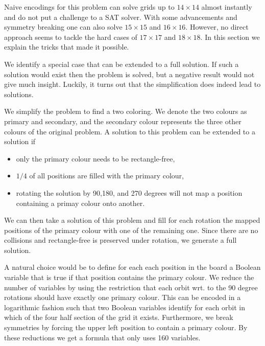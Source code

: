 \documentclass[conference]{IEEEtran}
\begin{document}
Naive encodings for this problem can solve grids up to $14\times 14$  almost instantly and do not put a challenge to a SAT solver.
With some advancements and symmetry breaking one can also solve $15\times 15$  and $16\times 16$. However, no direct approach seems to tackle
the hard cases of $17\times 17$ and $18\times 18$. In this section we explain the tricks that made it possible. 

We identify a special case that can be extended to a full solution. If such a solution would exist then the problem is
solved, but a negative result would not give much insight. Luckily, it turns out that the simplification does indeed
lead to solutions. 

We simplify the problem to find a two coloring. We denote the two colours as primary and secondary, and the secondary
colour represents the three other colours of the original problem. A solution to this problem can be extended to a
solution if

\begin{itemize}
    \item only the primary colour needs to be rectangle-free,
    \item $1/4$ of all positions are filled with the primary colour, 
    \item rotating the solution by 90,180, and 270 degrees will not map a position containing a primay colour onto
another. 
\end{itemize}

We can then take a solution of this problem and fill for each rotation the mapped positions of the primary colour with
one of the remaining one. Since there are no collisions and rectangle-free is preserved under rotation, we generate a
full solution. 



A natural choice would be to define for each  each position in the board a Boolean variable that is true if that
position contains the primary colour. We reduce the number of variables by using the restriction that each orbit wrt. to
the 90 degree rotations should have exactly one primary colour. This can be encoded in a logarithmic fashion such that
two Boolean variables identify for each orbit in which of the four half section of the grid it exists. Furthermore, we
break symmetries by forcing the upper left position to contain a primary colour. By these reductions we get a formula
that only uses 160 variables. 
\end{document}

